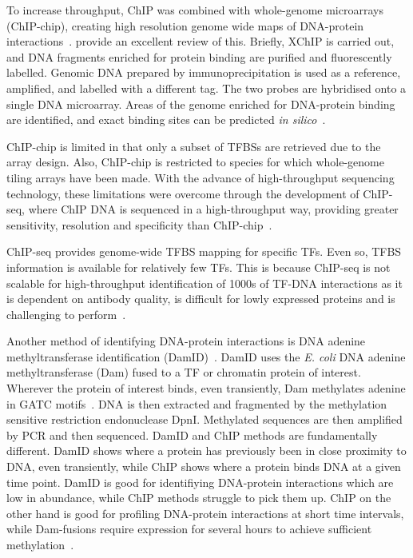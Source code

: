 \documentclass[../main.tex]{subfiles}
\begin{document}
To increase throughput, ChIP was combined with whole\hyp{}genome microarrays (ChIP\hyp{}chip), creating high resolution genome wide maps of DNA\hyp{}protein interactions~\autocite{weinmannIsolatingHumanTranscription2002,wellsIdentificationNovelPRb2003,renGenomeWideLocationFunction2000}.
\textcite*{buckChIPchipConsiderationsDesign2004} provide an excellent review of this.
Briefly, XChIP is carried out, and DNA fragments enriched for protein binding are purified and fluorescently labelled.
Genomic DNA prepared by immunoprecipitation is used as a reference, amplified, and labelled with a different tag.
The two probes are hybridised onto a single DNA microarray.
Areas of the genome enriched for DNA\hyp{}protein binding are identified, and exact binding sites can be predicted \textit{in silico}~\autocite{liuAlgorithmFindingProtein2002}.

ChIP\hyp{}chip is limited in that only a subset of TFBSs are retrieved due to the array design.
Also, ChIP\hyp{}chip is restricted to species for which whole\hyp{}genome tiling arrays have been made.
With the advance of high\hyp{}throughput sequencing technology, these limitations were overcome through the development of ChIP\hyp{}seq, where ChIP DNA is sequenced in a high\hyp{}throughput way, providing greater sensitivity, resolution and specificity than ChIP\hyp{}chip~\autocite{johnsonGenomeWideMappingVivo2007}.

ChIP\hyp{}seq provides genome\hyp{}wide TFBS mapping for specific TFs.
Even so, TFBS information is available for relatively few TFs.
This is because ChIP\hyp{}seq is not scalable for high\hyp{}throughput identification of 1000s of TF\hyp{}DNA interactions as it is dependent on antibody quality, is difficult for lowly expressed proteins and is challenging to perform~\autocite{kidderChIPSeqTechnicalConsiderations2011}.

Another method of identifying DNA-protein interactions is DNA adenine methyltransferase identification (DamID)~\autocite{steenselIdentificationVivoDNA2000}. DamID uses the \textit{E. coli} DNA adenine methyltransferase (Dam) fused to a TF or chromatin protein of interest.
Wherever the protein of interest binds, even transiently, Dam methylates adenine in GATC motifs~\autocite{sanchez-romeroDNAMethylationBacteria2015}.
DNA is then extracted and fragmented by the methylation sensitive restriction endonuclease DpnI.
Methylated sequences are then amplified by PCR and then sequenced.
DamID and ChIP methods are fundamentally different.
DamID shows where a protein has previously been in close proximity to DNA, even transiently, while ChIP shows where a protein binds DNA at a given time point.
DamID is good for identifiying DNA-protein interactions which are low in abundance, while ChIP methods struggle to pick them up.
ChIP on the other hand is good for profiling DNA-protein interactions at short time intervals, while Dam-fusions require expression for several hours to achieve sufficient methylation~\autocite{augheyDamItGood2016}.
\end{document}
